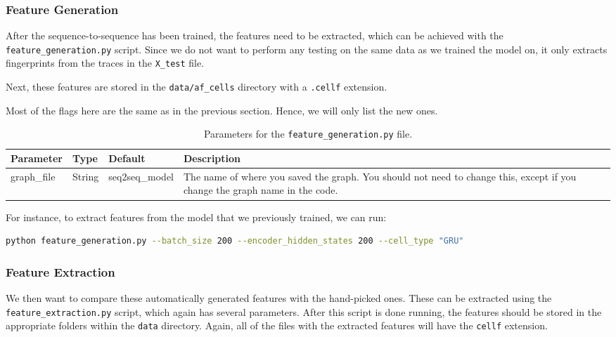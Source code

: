 \subsubsection{Feature Generation}

After the sequence-to-sequence has been trained, the features need to be extracted, which can be achieved with the \texttt{feature\_generation.py} script.
Since we do not want to perform any testing on the same data as we trained the model on, it only extracts fingerprints from the traces in the \texttt{X\_test} file.

Next, these features are stored in the \texttt{data/af\_cells} directory with a \texttt{.cellf} extension.

Most of the flags here are the same as in the previous section.
Hence, we will only list the new ones.

\newpage

\begin{table}[ht]
  \centering
  \begin{tabular}{ l | l | l | p{} }
    \textbf{Parameter} & \textbf{Type} & \textbf{Default} & \textbf{Description} \\ \hline \hline
    graph\_file & String & seq2seq\_model & The name of where you saved the graph. You should not need to change this, except if you change the graph name in the code.
  \end{tabular}
  \caption{Parameters for the \texttt{feature\_generation.py} file.}
\end{table}

\noindent
For instance, to extract features from the model that we previously trained, we can run:
\begin{lstlisting}[language=Bash]
python feature_generation.py --batch_size 200 --encoder_hidden_states 200 --cell_type "GRU"
\end{lstlisting}

\subsubsection{Feature Extraction}

We then want to compare these automatically generated features with the hand-picked ones.
These can be extracted using the \texttt{feature\_extraction.py} script, which again has several parameters.
After this script is done running, the features should be stored in the appropriate folders within the \texttt{data} directory.
Again, all of the files with the extracted features will have the \texttt{cellf} extension.

